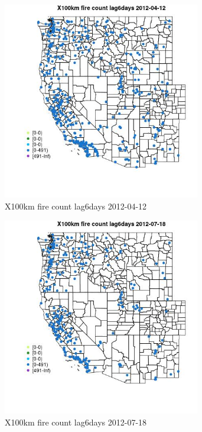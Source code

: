 \begin{figure} 
\centering  
\includegraphics[width=0.77\textwidth]{Code_Outputs/Report_ML_input_PM25_Step4_part_e_de_duplicated_aves_compiled_2019-05-14wNAs_MapObsX100km_fire_count_lag6days2012-04-12.jpg} 
\caption{\label{fig:Report_ML_input_PM25_Step4_part_e_de_duplicated_aves_compiled_2019-05-14wNAsMapObsX100km_fire_count_lag6days2012-04-12}X100km fire count lag6days 2012-04-12} 
\end{figure} 
 

\begin{figure} 
\centering  
\includegraphics[width=0.77\textwidth]{Code_Outputs/Report_ML_input_PM25_Step4_part_e_de_duplicated_aves_compiled_2019-05-14wNAs_MapObsX100km_fire_count_lag6days2012-07-18.jpg} 
\caption{\label{fig:Report_ML_input_PM25_Step4_part_e_de_duplicated_aves_compiled_2019-05-14wNAsMapObsX100km_fire_count_lag6days2012-07-18}X100km fire count lag6days 2012-07-18} 
\end{figure} 
 

